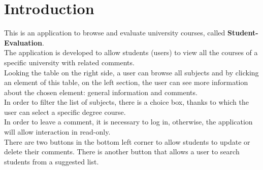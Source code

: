 \documentclass[a4paper]{article}
\begin{document}
\baselineskip 13pt
	
\begin{frontespizio} 
 \Preambolo{\renewcommand{\frontpretitlefont}{\fontsize{15}{12}\scshape}}
\Rientro {1cm}
 \Punteggiatura {}
\end{frontespizio}


\tableofcontents\thispagestyle{empty}
\clearpage


\section{Introduction}
This is an application to browse and evaluate university courses, called \textbf{Student-Evaluation}.\\
The application is developed to allow students (users) to view all the courses of a specific university with related comments.\\ 
Looking the table on the right side, a user can browse all subjects and by clicking an element of this table, on the left section, the user can see more information about the chosen element: general information and comments.\\ 
In order to filter the list of subjects, there is a choice box, thanks to which the user can select a specific degree course. \\
In order to leave a comment, it is necessary to log in, otherwise, the application will allow interaction in read-only.\\
There are two buttons in the bottom left corner to allow students to update or delete their comments. There is another button that allows a user to search students from a suggested list.
\end{document}
